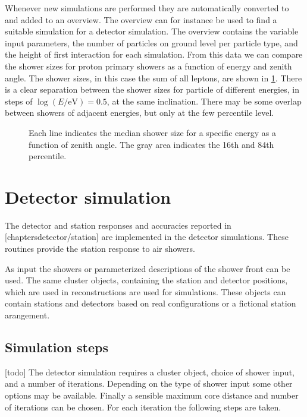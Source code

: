 Whenever new simulations are performed they are automatically converted to \hdf and added to an overview. The overview can for instance be used to find a suitable \corsika simulation for a detector simulation. The overview contains the variable input parameters, the number of particles on ground level per particle type, and the height of first interaction for each simulation. From this data we can compare the shower sizes for proton primary showers as a function of energy and zenith angle. The shower sizes, in this case the sum of all leptons, are shown in \cref{fig:simulations_shower_sizes}. There is a clear separation between the shower sizes for particle of different energies, in steps of $\log \left(E / {\si{\eV}}\right) = 0.5$, at the same inclination. There may be some overlap between showers of adjacent energies, but only at the few percentile level.

\begin{figure}
    \centering
    
    \caption{             Each line indicates the median shower size for a specific energy as a function of zenith angle. The gray area indicates the 16th and 84th percentile.}
    \label{fig:simulations_shower_sizes}
\end{figure}


\section{Detector simulation}

The detector and station responses and accuracies reported in [chaptersdetector/station] are implemented in the detector simulations. These routines provide the station response to air showers.

As input the \corsika showers or parameterized descriptions of the shower front can be used. The same cluster objects, containing the station and detector positions, which are used in reconstructions are used for simulations. These objects can contain stations and detectors based on real configurations or a fictional station arangement.


\subsection{Simulation steps}

[todo]
The detector simulation requires a cluster object, choice of shower input, and a number of iterations. Depending on the type of shower input some other options may be available. Finally a sensible maximum core distance and number of iterations can be chosen. For each iteration the following steps are taken.


